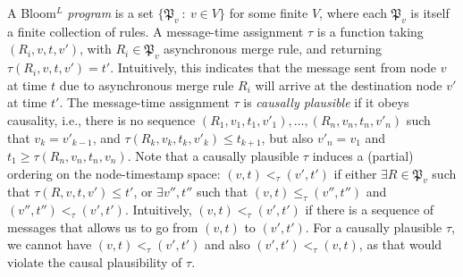 \documentclass{article}
\numberwithin{equation}{section}
\begin{document}
A Bloom$^L$ \emph{program} is a set $\{\mathfrak{P}_v ~:~ v \in V\}$ for some finite $V$, where each $\mathfrak{P}_v$ is itself a finite collection of rules.
A message-time assignment $\tau$ is a function taking $(R_i, v, t, v')$, with $R_i \in \mathfrak{P}_v$ asynchronous merge rule, and returning $\tau(R_i, v, t, v') = t'$.
Intuitively, this indicates that the message sent from node $v$ at time $t$ due to asynchronous merge rule $R_i$ will arrive at the destination node $v'$ at time $t'$.
The message-time assignment $\tau$ is \emph{causally plausible} if it obeys causality, i.e., there is no sequence $(R_1, v_1, t_1, v'_1), \dots, (R_n, v_n, t_n, v'_n)$ such that $v_k = v'_{k-1}$, and $\tau(R_k, v_k, t_k, v'_k) \leq t_{k+1}$, but also $v'_n = v_1$ and $t_1 \geq \tau(R_n, v_n, t_n, v_n)$.
Note that a causally plausible $\tau$ induces a (partial) ordering on the node-timestamp space: $(v,t) <_\tau (v',t')$ if either $\exists R \in \mathfrak{P}_v$ such that $\tau(R,v,t,v') \leq t'$, or $\exists v'', t''$ such that $(v,t) \leq_\tau (v'', t'')$ and $(v'', t'') <_\tau (v',t')$.
Intuitively, $(v,t) <_\tau (v',t')$ if there is a sequence of messages that allows us to go from $(v,t)$ to $(v',t')$.
For a causally plausible $\tau$, we cannot have $(v,t) <_\tau (v',t')$ and also $(v',t') <_\tau (v,t)$, as that would violate the causal plausibility of $\tau$.
\end{document}
